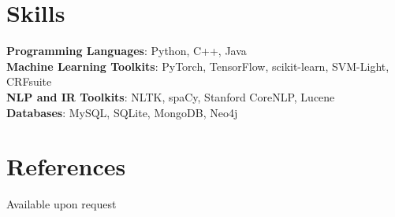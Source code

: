 \documentclass[margin,line]{res}
\newenvironment{list1}{
  \begin{list}{\ding{113}}{%
      \setlength{\itemsep}{0in}
      \setlength{\parsep}{0in} \setlength{\parskip}{0in}
      \setlength{\topsep}{0in} \setlength{\partopsep}{0in}
      \setlength{\leftmargin}{0.17in}}}{\end{list}}
\begin{document}
\begin{resume}
\begin{pycode}
\begin{list1}
{  print(r'%

print(r'\end{list1}')
\end{pycode}

\section{\sc Skills}
{\bf Programming Languages}: Python, C++, Java\\
{\bf Machine Learning Toolkits}: PyTorch, TensorFlow, scikit-learn, SVM-Light, CRFsuite\\
{\bf NLP and IR Toolkits}: NLTK, spaCy, Stanford CoreNLP, Lucene\\
{\bf Databases}: MySQL, SQLite, MongoDB, Neo4j\\

\section{\sc References}
Available upon request
\end{resume}
\end{document}
